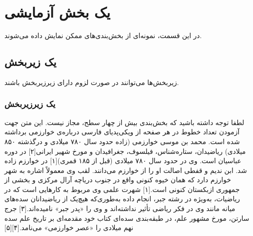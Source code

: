 \section{یک بخش آزمایشی}
در این قسمت، نمونه‌ای از بخش‌بندی‌های ممکن نمایش داده می‌شوند.
	\subsection{یک زیربخش}
	زیربخش‌ها می‌توانند در صورت لزوم دارای زیرزیربخش باشند.
		\subsubsection{یک زیرزیربخش}
		لطفا توجه داشته باشید که بخش‌بندی بیش از چهار سطح، مجاز نیست.
\newpage
این متن جهت آزمودن تعداد خطوط در هر صفحه از ویکی‌پدیای فارسی درباره‌ی خوارزمی برداشته شده است. 
محمد بن موسی خوارزمی (زاده حدود سال ۷۸۰ میلادی و درگذشته ۸۵۰ میلادی) ریاضیدان، ستاره‌شناس، فیلسوف، جغرافیدان و مورخ شهیر ایرانی[۲] در دوره عباسیان است. وی در حدود سال ۷۸۰ میلادی (قبل از ۱۸۵ قمری)[۱] در خوارزم زاده شد. ابن ندیم و قفطی اصالت او را از خوارزم می‌دانند. لقب وی معمولاً اشاره به شهر خوارزم دارد که همان خیوه کنونی واقع در جنوب دریاچه آرال مرکزی و بخشی از جمهوری ازبکستان کنونی است.[۱] شهرت علمی وی مربوط به کارهایی است که در ریاضیات، به‌ویژه در رشته جبر، انجام داده به‌طوری‌که هیچ‌یک از ریاضیدانان سده‌های میانه مانند وی در فکر ریاضی تأثیر نداشته‌اند و وی را «پدر جبر» نامیده‌اند.[۳] جرج سارتن، مورخ مشهور علم، در طبقه‌بندی سده‌ای کتاب خود مقدمه‌ای بر تاریخ علم سده نهم میلادی را «عصر خوارزمی» می‌نامد.[۴][۵]

